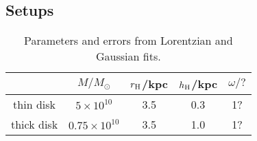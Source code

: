 \subsection*{Setups}
\begin{table}[h]
	\centering
	\begin{tabular}{ccccc}
		& $M/M_\odot$ & $r_{\rm H}$/kpc & $h_{\rm H} $/kpc & $\omega/?$ \\
		\hline
		thin disk & $5 \times 10^{10}$ & 3.5 & 0.3 & 1? \\
		thick disk & $ 0.75 \times 10^{10} $ & 3.5 & 1.0 & 1? \\
	\end{tabular}
	\caption{Parameters and errors from Lorentzian and Gaussian fits.}
	\label{fit params}
\end{table}

